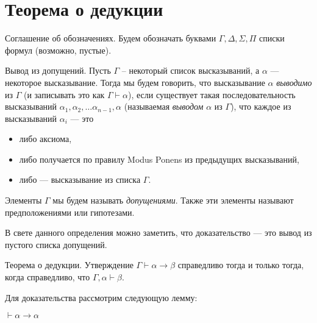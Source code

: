 \section{Теорема о дедукции}

Соглашение об обозначениях. Будем обозначать буквами 
$\Gamma, \Delta, \Sigma, \Pi$ списки формул (возможно, пустые).

\begin{definition}{Вывод из допущений.}
Пусть $\Gamma$ -- некоторый список высказываний, а $\alpha$ --- 
некоторое высказывание. 
Тогда мы будем говорить, что высказывание $\alpha$ \emph{выводимо} из $\Gamma$ 
(и записывать это как $\Gamma \vdash \alpha$), если существует такая 
последовательность высказываний $\alpha_1, \alpha_2, \dots \alpha_{n-1}, \alpha$
(называемая \emph{выводом} $\alpha$ из $\Gamma$), 
что каждое из высказываний $\alpha_i$ --- это 
\begin{itemize}
\item либо аксиома,
\vspace{-0.2cm}
\item либо получается по правилу Modus Ponens из предыдущих высказываний, 
\vspace{-0.2cm}
\item либо --- высказывание из списка $\Gamma$.
\end{itemize}
Элементы $\Gamma$ мы будем называть \emph{допущениями}. Также эти элементы
называют предположениями или гипотезами. 
\end{definition}

В свете данного определения можно заметить, что доказательство --- это
вывод из пустого списка допущений. 

\begin{theorem}\label{deduction_theorem}{Теорема о дедукции.}
Утверждение $\Gamma \vdash \alpha \rightarrow \beta$ справедливо тогда и 
только тогда, когда справедливо, что $\Gamma, \alpha \vdash \beta$.
\end{theorem}

Для доказательства рассмотрим следующую лемму:

\begin{lemma}
$\vdash \alpha \rightarrow \alpha$
\end{lemma}

